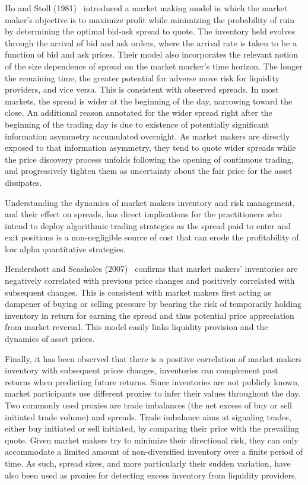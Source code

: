 Ho and Stoll (1981)~\cite{ho1981} introduced a market making model in which the market maker's objective is to maximize profit while minimizing the probability of ruin by determining the optimal bid-ask spread to quote. The inventory held evolves through the arrival of bid and ask orders, where the arrival rate is taken to be a function of bid and ask prices. Their model also incorporates the relevant notion of the size dependence of spread on the market marker's time horizon. The longer the remaining time, the greater potential for adverse move risk for liquidity providers, and vice versa. This is consistent with observed spreads. In most markets, the spread is wider at the beginning of the day, narrowing toward the close. An additional reason annotated for the wider spread right after the beginning of the trading day is due to existence of potentially significant information asymmetry accumulated overnight. As market makers are directly exposed to that information asymmetry, they tend to quote wider spreads while the price discovery process unfolds following the opening of continuous trading, and progressively tighten them as uncertainty about the fair price for the asset dissipates.


Understanding the dynamics of market makers inventory and risk management, and their effect on spreads, has direct implications for the practitioners who intend to deploy algorithmic trading strategies as the spread paid to enter and exit positions is a non-negligible source of cost that can erode the profitability of low alpha quantitative strategies. 


Hendershott and Seasholes (2007)~\cite{hendersea} confirms that market makers' inventories are negatively correlated with previous price changes and positively correlated with subsequent changes. This is consistent with market makers first acting as dampener of buying or selling pressure by bearing the risk of temporarily holding inventory in return for earning the spread and thus potential price appreciation from market reversal. This model easily links liquidity provision and the dynamics of asset prices. 


Finally, it has been observed that there is a positive correlation of market makers inventory with subsequent prices changes, inventories can complement past returns when predicting future returns. Since inventories are not publicly known, market participants use different proxies to infer their values throughout the day. Two commonly used proxies are trade imbalances (the net excess of buy or sell initiated trade volume) and spreads. Trade imbalance aims at signaling trades, either buy initiated or sell initiated, by comparing their price with the prevailing quote. Given market makers try to minimize their directional risk, they can only accommodate a limited amount of non-diversified inventory over a finite period of time. As such, spread sizes, and more particularly their sudden variation, have also been used as proxies for detecting excess inventory from liquidity providers.\label{in:micro2}\label{in:fund_trade4}
